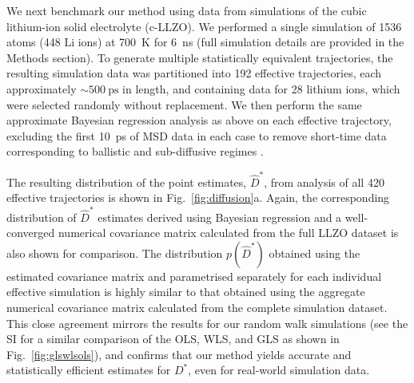 \documentclass[reprint,superscriptaddress,nobibnotes,amsmath,amssymb,aps,prx,hidelinks,linenumbers]{revtex4-2}
\newcommand{\prob}[1]{\ensuremath{p(#1)}}
\newcommand{\Dest}{\ensuremath{\widehat{D}^*}}
\newcommand{\D}{\ensuremath{D^*}}
\newcommand{\var}[1]{\ensuremath{\sigma^2[#1]}}
\newcommand{\varest}[1]{\ensuremath{\widehat{\sigma}^2[#1]}}
\begin{document}
We next benchmark our method using data from simulations of the cubic lithium-ion solid electrolyte  (c-LLZO).
We performed a single simulation of \num{1536} atoms (\num{448} Li ions) at \SI{700}{K} for \SI{6}{\nano\second} (full simulation details are provided in the Methods section).
To generate multiple statistically equivalent trajectories, the resulting simulation data was partitioned into \num{192} effective trajectories, each approximately $\sim\SI{500}{\ps}$ in length, and containing data for \num{28} lithium ions, which were selected randomly without replacement.
We then perform the same approximate Bayesian regression analysis as above on each effective trajectory, excluding the first \SI{10}{ps} of MSD data in each case to remove short-time data corresponding to ballistic and sub-diffusive regimes \cite{he_statistical_2018}.

The resulting distribution of the point estimates, $\Dest$, from analysis of all \num{420} effective trajectories is shown in Fig.~\ref{fig:diffusion}a.
Again, the corresponding distribution of $\Dest$ estimates derived using Bayesian regression and a well-converged numerical covariance matrix calculated from the full LLZO dataset is also shown for comparison.
The distribution $\prob{\Dest}$ obtained using the estimated covariance matrix and parametrised separately for each individual effective simulation is highly similar to that obtained using the aggregate numerical covariance matrix calculated from the complete simulation dataset.
This close agreement mirrors the results for our random walk simulations (see the SI for a similar comparison of the OLS, WLS, and GLS as shown in Fig.~\ref{fig:glswlsols}), and confirms that our method yields accurate and statistically efficient estimates for $\D$, even for real-world simulation data.

\end{document}
